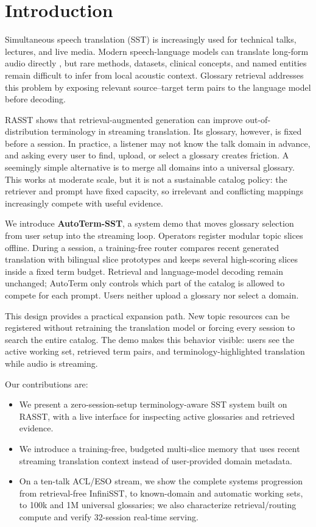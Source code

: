 \section{Introduction}

Simultaneous speech translation (SST) is increasingly used for technical talks,
lectures, and live media. Modern speech-language models can translate long-form
audio directly \citep{xu2025qwen3omni,ouyang2025infinisst}, but rare methods,
datasets, clinical concepts, and named entities remain difficult to infer from
local acoustic context. Glossary retrieval addresses this problem by exposing
relevant source--target term pairs to the language model before decoding.

RASST \citep{luo2026rasst} shows that retrieval-augmented generation can improve
out-of-distribution terminology in streaming translation. Its glossary,
however, is fixed before a session. In practice, a listener may not know the
talk domain in advance, and asking every user to find, upload, or select a
glossary creates friction. A seemingly simple alternative is to merge all
domains into a universal glossary. This works at moderate scale, but it is not a
sustainable catalog policy: the retriever and prompt have fixed capacity, so
irrelevant and conflicting mappings increasingly compete with useful evidence.

We introduce \textbf{AutoTerm-SST}, a system demo that moves glossary selection
from user setup into the streaming loop. Operators register modular topic
slices offline. During a session, a training-free router compares recent
generated translation with bilingual slice prototypes and keeps several
high-scoring slices inside a fixed term budget. Retrieval and language-model
decoding remain unchanged; AutoTerm only controls which part of the catalog is
allowed to compete for each prompt. Users neither upload a glossary nor select
a domain.

This design provides a practical expansion path. New topic resources can be
registered without retraining the translation model or forcing every session
to search the entire catalog. The demo makes this behavior visible: users see
the active working set, retrieved term pairs, and terminology-highlighted
translation while audio is streaming.

Our contributions are:
\begin{itemize}
    \item We present a zero-session-setup terminology-aware SST system built on
    RASST, with a live interface for inspecting active glossaries and retrieved
    evidence.
    \item We introduce a training-free, budgeted multi-slice memory that uses
    recent streaming translation context instead of user-provided domain
    metadata.
    \item On a ten-talk ACL/ESO stream, we show the complete systems
    progression from retrieval-free InfiniSST, to known-domain and automatic
    working sets, to
    100k and 1M universal glossaries; we also characterize retrieval/routing
    compute and verify 32-session real-time serving.
\end{itemize}
